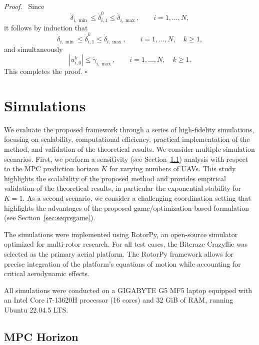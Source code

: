 \documentclass[letterpaper,journal]{IEEEtran}
\newenvironment{proof}{\par\noindent\textit{Proof.}\ }{\hfill$\square$\par}
\begin{document}
\begin{proof}
Since
\[
\dot{\delta}_{i,\min}\le \dot{\delta}^{0}_{i,1}\le \dot{\delta}_{i,\max},
\qquad i=1,\dots,N,
\]
it follows by induction that
\[
\dot{\delta}_{i,\min}\le \dot{\delta}^{k}_{i,1}\le \dot{\delta}_{i,\max},
\qquad i=1,\dots,N,\quad k\ge 1,
\]
and simultaneously
\[
|u_{i,0}^k|\le \ddot{\gamma}_{i,\max},
\qquad i=1,\dots,N,\quad k\ge 1.
\]
This completes the proof.
    \end{proof}

\section{Simulations}\label{sec:sim}

We evaluate the proposed framework through a series of high-fidelity simulations, focusing on scalability, computational efficiency, practical implementation of the method, and validation of the theoretical results.
We consider multiple simulation scenarios. First, we perform a sensitivity  (see Section~\ref{sec:MPC-horizon}) analysis with respect to the MPC prediction horizon $K$ for varying numbers of UAVs. This study highlights the scalability of the proposed method and provides empirical validation of the theoretical results, in particular the exponential stability for $K = 1$.
As a second scenario, we consider a challenging coordination setting that highlights the advantages of the proposed game/optimization-based formulation (see Section~\ref{sec:seqvsgame}). 

The simulations were implemented using RotorPy\cite{folk2023rotorpy}, an open-source simulator optimized for multi-rotor research. For all test cases, the Bitcraze Crazyflie was selected as the primary aerial platform. The RotorPy framework allows for precise integration of the platform's equations of motion while accounting for critical aerodynamic effects.


All simulations were conducted on a GIGABYTE G5 MF5 laptop equipped 
with an Intel Core i7-13620H processor (16 cores) and 32 GiB of RAM, 
running Ubuntu 22.04.5 LTS.

\subsection{MPC Horizon}\label{sec:MPC-horizon}
\end{document}
